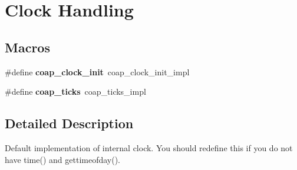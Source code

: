 \hypertarget{group__clock}{}\section{Clock Handling}
\label{group__clock}
\subsection*{Macros}
\begin{DoxyCompactItemize}
\item 
\hypertarget{group__clock_ga30cc030c56bca3f2420e671e0650ca69}{}\#define {\bfseries coap\+\_\+clock\+\_\+init}~coap\+\_\+clock\+\_\+init\+\_\+impl\label{group__clock_ga30cc030c56bca3f2420e671e0650ca69}

\item 
\hypertarget{group__clock_gaeacdaf84024e9c066fb5c37e82dc1f17}{}\#define {\bfseries coap\+\_\+ticks}~coap\+\_\+ticks\+\_\+impl\label{group__clock_gaeacdaf84024e9c066fb5c37e82dc1f17}

\end{DoxyCompactItemize}


\subsection{Detailed Description}
Default implementation of internal clock. You should redefine this if you do not have time() and gettimeofday(). 